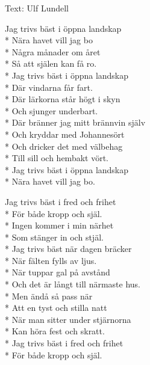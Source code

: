 \begin{SongText}
    \begin{SongInfo}
        Text: Ulf Lundell
    \end{SongInfo}
    \begin{SongVerse}
        Jag trivs bäst i öppna landskap\\*%
        Nära havet vill jag bo\\*%
        Några månader om året\\*%
        Så att själen kan få ro.\\*%
        Jag trivs bäst i öppna landskap\\*%
        Där vindarna får fart.\\*%
        Där lärkorna står högt i skyn\\*%
        Och sjunger underbart.\\*%
        Där bränner jag mitt brännvin själv\\*%
        Och kryddar med Johannesört\\*%
        Och dricker det med välbehag\\*%
        Till sill och hembakt vört.\\*%
        Jag trivs bäst i öppna landskap\\*%
        Nära havet vill jag bo. 
    \end{SongVerse}
    \begin{SongVerse}
        Jag trivs bäst i fred och frihet\\*%
        För både kropp och själ.\\*%
        Ingen kommer i min närhet\\*%
        Som stänger in och stjäl.\\*%
        Jag trivs bäst när dagen bräcker\\*%
        När fälten fylls av ljus.\\*%
        När tuppar gal på avstånd\\*%
        Och det är långt till närmaste hus.\\*%
        Men ändå så pass när\\*%
        Att en tyst och stilla natt\\*%
        När man sitter under stjärnorna\\*%
        Kan höra fest och skratt.\\*%
        Jag trivs bäst i fred och frihet\\*%
        För både kropp och själ. 
    \end{SongVerse}

\end{SongText}
